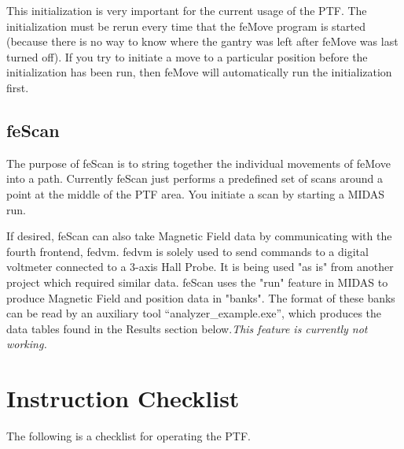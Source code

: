 \documentclass[a4paper,12pt]{article}
\begin{document}
This initialization is very important for the current usage of the PTF.  The initialization
must be rerun every time that the feMove program is started (because there is no way
to know where the gantry was left after feMove was last turned off).
If you try to initiate a move to a particular position before the initialization has been
run, then feMove will automatically run the initialization first.



\subsection{feScan}
	
The purpose of feScan is to string together the individual movements of feMove into a path.  
Currently feScan just performs a predefined set of scans around a point at the middle of the PTF area.
You initiate a scan by starting a MIDAS run.

If desired, feScan can 
also take Magnetic Field data by communicating with the fourth frontend, fedvm. fedvm is 
solely used to send commands to a digital voltmeter connected to a 3-axis Hall Probe. It 
is being used "as is" from another project which required similar data. feScan uses the 
"run" feature in MIDAS to produce Magnetic Field and position data in "banks". The format 
of these banks can be read by an auxiliary tool “analyzer\_example.exe”, which produces 
the data tables found in the Results section below.\textit{This feature is currently not 
working.}
	
\section{Instruction Checklist}

The following is a checklist for operating the PTF.
\end{document}
